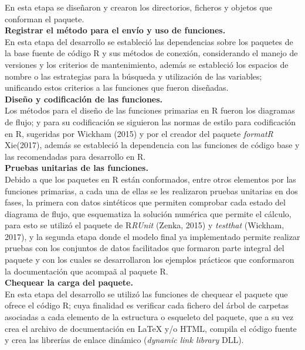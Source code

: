 En esta etapa se dise\~naron y crearon los directorios, ficheros y objetos que conforman el paquete.\\ 

\noindent
\textbf{Registrar el m\'etodo para el env\'io y uso de funciones.}\\

En esta etapa del desarrollo se estableci\'o las dependencias sobre los paquetes de la base fuente de código R y sus métodos de conexión, considerando el manejo de versiones y los criterios de mantenimiento, además  se estableci\'o  los espacios de nombre o las estrategias para la búsqueda y utilización de las variables; unificando estos criterios a las funciones que fueron dise\~nadas.\\

\noindent
\textbf{Dise\~no y codificaci\'on de las funciones.}\\

Los m\'etodos para el dise\~no de las funciones primarias en R fueron los diagramas de flujo; y para su codificaci\'on se siguieron las normas de estilo para codificaci\'on en R, sugeridas por Wickham (2015) y por el creador del paquete \emph{formatR} Xie(2017), adem\'as se estableci\'o la dependencia con las funciones de c\'odigo base y las recomendadas para desarrollo en R.\\

\noindent
\textbf{Pruebas unitarias de las funciones.}\\

Debido a que los paquetes en R est\'an conformados, entre otros elementos por las funciones primarias, a cada una de ellas se les realizaron pruebas unitarias en dos fases, la primera con datos sint\'eticos que permiten comprobar cada estado del diagrama de flujo, que esquematiza la soluci\'on num\'erica que permite el c\'alculo, para esto se utiliz\'o el paquete de R\emph{RUnit} (Zenka, 2015) y \emph{testthat} (Wickham, 2017), y la segunda etapa donde el modelo final ya implementado permite realizar pruebas con los conjuntos de datos facilitados que formaron parte integral del paquete y con los cuales se desarrollaron los ejemplos pr\'acticos que conformaron la documentaci\'on que acompa\~a al paquete R.\\


\newpage  
\noindent
\textbf{Chequear la carga del paquete.}\\

En esta etapa del desarrollo se utiliz\'o las funciones de chequear el paquete que ofrece el código R; cuya finalidad es verificar cada fichero del árbol de carpetas asociadas a cada elemento de la estructura o esqueleto del paquete, que a su vez crea el archivo de documentación en LaTeX y/o HTML, compila el código fuente y crea las librerías de enlace dinámico (\emph{dynamic link library} DLL).\\  

